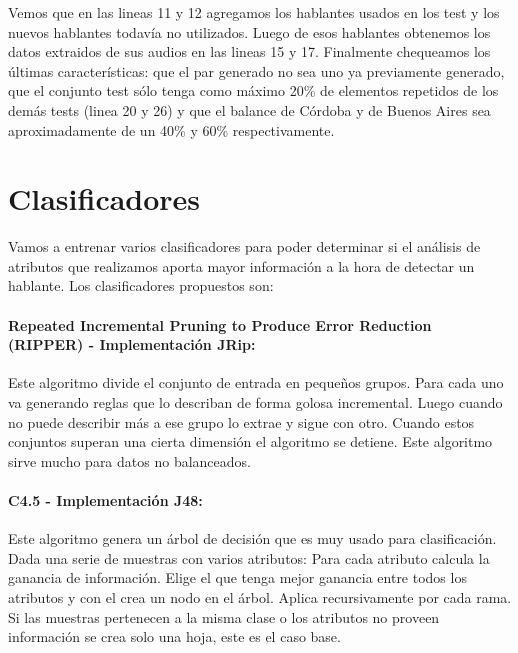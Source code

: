 Vemos que en las lineas 11 y 12 agregamos los hablantes usados en los test y los nuevos hablantes todavía no utilizados. Luego de esos hablantes obtenemos los datos extraidos de sus audios en las lineas 15 y 17. Finalmente chequeamos los últimas características: que el par generado no sea uno ya previamente generado, que el conjunto test sólo tenga como máximo 20\% de elementos repetidos de los demás tests (linea 20 y 26) y que el balance de Córdoba y de Buenos Aires sea aproximadamente de un 40\% y 60\% respectivamente.

\section{Clasificadores}

Vamos a entrenar varios clasificadores para poder determinar si el análisis de atributos que realizamos aporta mayor información a la hora de detectar un hablante. Los clasificadores propuestos son: 

\paragraph{Repeated Incremental Pruning to Produce Error Reduction (RIPPER) \cite{Cohen1995} - Implementación JRip:}


Este algoritmo divide el conjunto de entrada en pequeños grupos. Para cada uno va generando reglas que lo describan de forma golosa incremental. Luego cuando no puede describir más a ese grupo lo extrae y sigue con otro. Cuando estos conjuntos superan una cierta dimensión el algoritmo se detiene. Este algoritmo sirve mucho para datos no balanceados.

\paragraph{C4.5 \cite{Quinlan1993} - Implementación J48:}


Este algoritmo genera un árbol de decisión que es muy usado para clasificación. Dada una serie de muestras con varios atributos: Para cada atributo calcula la ganancia de información. Elige el que tenga mejor ganancia entre todos los atributos y con el crea un nodo en el árbol. Aplica recursivamente por cada rama. Si las muestras pertenecen a la misma clase o los atributos no proveen información se crea solo una hoja, este es el caso base.

